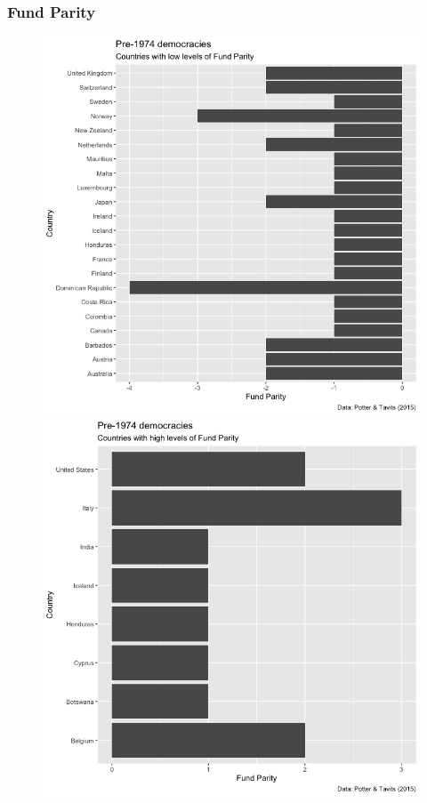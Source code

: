 \documentclass{beamer}
\begin{document}
\begin{frame}
	\frametitle{Fund Parity}
	\begin{figure}
		\begin{minipage}[b]{0.49\linewidth}
			\centering
			\includegraphics[width = \linewidth, height = .89\textheight]{Rplot05.jpeg}
		\end{minipage}
		\begin{minipage}[b]{0.49\linewidth}
			\centering
			\includegraphics[width = \linewidth, height = .89\textheight]{Rplot06.jpeg}
		\end{minipage}
	\end{figure}
\end{frame}
\end{document}
